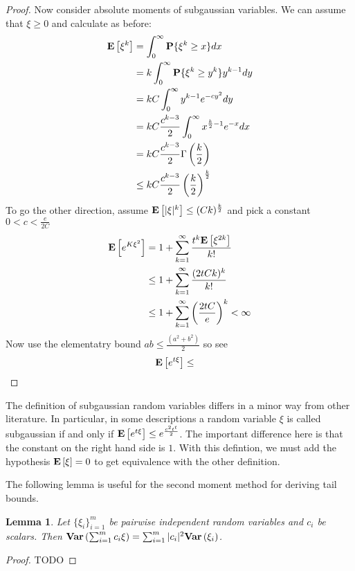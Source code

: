 \documentclass{amsart}
\newtheorem{lem}[thm]{Lemma}
\theoremstyle{remark}
\theoremstyle{definition}
\begin{document}
\begin{proof}
Now consider absolute moments of subgaussian variables.  We can assume
that $\xi \geq 0$ and calculate as before:
\begin{align*}
\textbf{E}\left[\xi^k\right] &= \int_0^\infty \textbf{P}\{\xi^k \geq x\} dx \\
&= k\int_0^\infty \textbf{P}\{\xi^k \geq y^k\} y^{k-1} dy \\
&= k C \int_0^\infty y^{k-1} e^{-cy^2} dy \\
&= k C \frac{c^{k-3}}{2} \int_0^\infty x^{\frac{k}{2}-1} e^{-x} dx \\
&= k C \frac{c^{k-3}}{2} \Gamma\left(\frac{k}{2}\right) \\
&\leq k C \frac{c^{k-3}}{2} \left(\frac{k}{2}\right)^\frac{k}{2} \\
\end{align*}
To go the other direction, assume $\textbf{E}\left[|\xi|^k\right] \leq
(Ck)^\frac{k}{2}$ and pick a constant $0 < c < \frac{e}{2C}$ 
\begin{align*}
\textbf{E}\left[e^{K\xi^2}\right] &= 1 + \sum_{k=1}^\infty
\frac{t^k\textbf{E}\left[\xi^{2k}\right]}{k!}\\
&\leq 1 + \sum_{k=1}^\infty
\frac{(2tCk)^k}{k!}\\
&\leq 1 + \sum_{k=1}^\infty
\left(\frac{2tC}{e}\right)^k < \infty \\
\end{align*}
Now use the elementatry bound $ab \leq \frac{(a^2 + b^2)}{2}$ so see
\begin{align*}
\textbf{E}\left[e^{t\xi}\right] &\leq 
\end{align*}
\end{proof}

The definition of subgaussian random variables differs in a minor way
from other literature.  In particular, in some descriptions a random
variable $\xi$ is called subgaussian if and only if
$\textbf{E}\left[e^{t\xi}\right] \leq e^{\frac{c^2 t^t}{2}}$.  The important
difference here is that the constant on the right hand side is $1$.
With this defintion, we must add the hypothesis $\textbf{E}\left[\xi\right]=0$
to get equivalence with the other definition.

The following lemma is useful for the second moment method for
deriving tail bounds.
\begin{lem}Let $\{\xi_i\}_{i=1}^m$ be pairwise independent random
  variables and $c_i$ be scalars.  Then $\textbf{Var} \left (\sum_{i=1}^m c_i \xi \right ) =
  \sum_{i=1}^m |c_i|^2\textbf{Var} \left (\xi_i \right )$.
\end{lem}
\begin{proof}
TODO
\end{proof}
\end{document}
